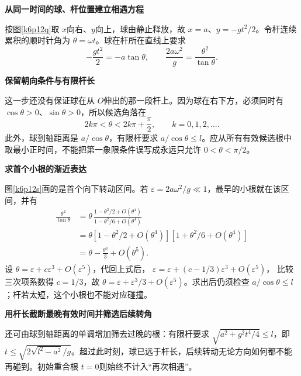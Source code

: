 \begin{solution}\textbf{从同一时间的球、杆位置建立相遇方程}\par\nobreak
按图\ref{k6p12q}取 $x$向右、$y$向上，球由静止释放，故 $x=a$、$y=-gt^2/2$。令杆连续累积的顺时针角为 $\theta=\omega t$。球在杆所在直线上要求
\[-\frac{gt^2}{2}=-a\tan\theta,\qquad
\boxed{\frac{2a\omega^2}{g}=\frac{\theta^2}{\tan\theta}}.
\]


\par\medskip{}\noindent\textbf{保留朝向条件与有限杆长}\par\nobreak
这一步还没有保证球在从 $O$伸出的那一段杆上。因为球在右下方，必须同时有 $\cos\theta>0$、$\sin\theta>0$，所以候选角落在
\[2k\pi<\theta<2k\pi+\frac\pi2,\qquad k=0,1,2,\ldots.
\]
此外，球到轴距离是 $a/\cos\theta$，有限杆要求 $a/\cos\theta\le l$。应从所有有效候选根中取最小正时间，不能把第一象限条件误写成永远只允许 $0<\theta<\pi/2$。




\par\medskip{}\noindent\textbf{求首个小根的渐近表达}\par\nobreak
图\ref{k6p12s}画的是首个向下转动区间。若 $\varepsilon=2a\omega^2/g\ll1$，最早的小根就在该区间，并有
\begin{align*}
\frac{\theta^2}{\tan\theta}
&=\theta\,\frac{1-\theta^2/2+O(\theta^4)}
{1-\theta^2/6+O(\theta^4)}\\
&=\theta[1-\theta^2/2+O(\theta^4)]
[1+\theta^2/6+O(\theta^4)]\\
&=\theta-\frac{\theta^3}{3}+O(\theta^5).
\end{align*}
设 $\theta=\varepsilon+c\varepsilon^3+O(\varepsilon^5)$，代回上式后，
$\varepsilon=\varepsilon+(c-1/3)\varepsilon^3+O(\varepsilon^5)$，
比较三次项系数得 $c=1/3$，故 $\boxed{\theta=\varepsilon+\varepsilon^3/3+O(\varepsilon^5)}$。求出后仍须检查 $a/\cos\theta\le l$；杆若太短，这个小根也不能对应碰撞。



\par\medskip{}\noindent\textbf{用杆长截断最晚有效时间并筛选后续转角}\par\nobreak
还可由球到轴距离的单调增加筛去过晚的根：有限杆要求 $\sqrt{a^2+g^2t^4/4}\le l$，即 $t\le\sqrt{2\sqrt{l^2-a^2}/g}$。超过此时刻，球已远于杆长，后续转动无论方向如何都不能再碰到。初始重合根 $t=0$则始终不计入“再次相遇”。


\end{solution}
